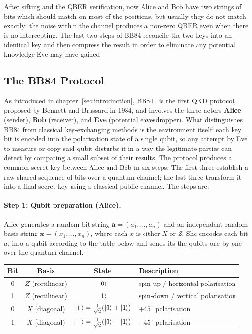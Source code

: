 \documentclass[12pt, a4paper]{article}
\begin{document}
After sifting and the QBER verification, now Alice and Bob have two strings of bits which should match on most of the positions, but usually they do not match exactly: the noise within the channel produces a non-zero QBER even when there is no intercepting. The last two steps of BB84 reconcile the two keys into an identical key and then compress the result in order to eliminate any potential knowledge Eve may have gained

\subsection{The BB84 Protocol}
\label{sec:bb84}

As introduced in chapter~\ref{sec:introduction}, BB84~\cite{bb84} is
the first QKD protocol, proposed by Bennett and
Brassard in 1984, and involves the three actors \textbf{Alice}
(sender), \textbf{Bob} (receiver), and \textbf{Eve} (potential
eavesdropper). What distinguishes BB84 from classical key-exchanging methods is the environment itself: each key bit is encoded into the polarisation state of a single qubit, so any attempt by Eve to measure or copy said qubit disturbs it in a way the legitimate parties can detect by comparing a small subset of their results. The protocol produces a common secret key between Alice and Bob in
six steps. The first three establish a raw shared sequence of bits
over a quantum channel; the last three transform it into a final
secret key using a classical public channel. The steps are:

\paragraph{Step 1: Qubit preparation (Alice).}
Alice generates a random bit string $\mathbf{a} = (a_1, \ldots, a_n)$ and an
independent random basis string $\mathbf{x} = (x_1, \ldots, x_n)$, where each
$x$ is either \textit{X} or \textit{Z}. She encodes each bit $a_i$ into a qubit according to the table below and sends its the qubits one by one over the quantum channel.

\begin{table}[H]
  \centering
  \label{tab:bb84-states}
  \begin{tabular}{@{} cccl @{}}
    \toprule
    \textbf{Bit} & \textbf{Basis} & \textbf{State} & \textbf{Description} \\
    \midrule
    0 & $Z$ (rectilinear) & $\ket{0}$ & spin-up / horizontal polarisation \\
    1 & $Z$ (rectilinear) & $\ket{1}$ & spin-down / vertical polarisation \\
    0 & $X$ (diagonal)    & $\ket{+} = \tfrac{1}{\sqrt{2}}(\ket{0}+\ket{1})$ & $+45^\circ$ polarisation \\
    1 & $X$ (diagonal)    & $\ket{-} = \tfrac{1}{\sqrt{2}}(\ket{0}-\ket{1})$ & $-45^\circ$ polarisation \\
    \bottomrule
  \end{tabular}
\end{table}
\end{document}
